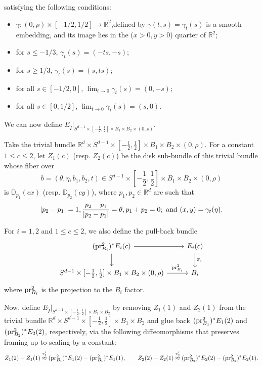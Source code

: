 \documentclass[11pt]{article}
\theoremstyle{definition}
\theoremstyle{remark}
\def\R{\mathbb{R}}
\def\D{\mathbb{D}}
\def\rI{{\mathring{I}}}
\def\tn#1{\textnormal{#1}}
\def\pr{{\textnormal{pr}}}
\begin{document}
satisfying the following conditions: 
\begin{itemize}
\item 
$\gamma:(0,\rho)\times[-1/2,1/2]\to\R^2$,defined by $\gamma(t,s)=\gamma_t(s)$ is a smooth embedding, and its image lies in the ($x>0,y>0$) quarter of $\R^2$;
\item for $s\leq-1/3$, $\gamma_t(s)=(-ts,-s)$; 
\item for $s\geq1/3$, $\gamma_t(s)=(s,ts)$;  
\item for all $s\in[-1/2,0]$, $\lim_{t\to0}\gamma_t(s)=(0,-s)$;
\item for all $s\in[0,1/2]$, $\lim_{t\to0}\gamma_t(s)=(s,0)$. 
\end{itemize}

We can now define $E_\rI|_{S^{d-1}\times[-\frac{1}{2},\frac{1}{2}]\times B_1\times B_2\times(0,\rho)}$.

Take the trivial bundle 
$\R^d\times S^{d-1}\times[-\frac{1}{2},\frac{1}{2}]\times B_1\times B_2\times(0,\rho)$. 
For a constant $1\le c\le2$, let $Z_1(c)$ (resp. $Z_2(c)$) be the disk sub-bundle of this trivial bundle whose fiber over $$b=(\theta,\eta,b_1,b_2,t)\in S^{d-1}\times[-\frac{1}{2},\frac{1}{2}]\times B_1\times B_2\times(0,\rho)$$ 
is $\D_{p_1}(cx)$ (resp. $\D_{p_2}(cy)$), 
where $p_1,p_2\in\R^d$ are such that \begin{equation}\label{xyp1p2_eqn}
|p_2-p_1|=1, \frac{p_2-p_1}{|p_2-p_1|}=\theta, p_1+p_2=0; \tn{ and } (x,y)=\gamma_t(\eta).
\end{equation}

For $i=1,2$ and $1\le c\le2$, we also define the pull-back bundle 
\[\begin{tikzcd}
(\pr^2_{B_i})^*E_i(c)\rar\dar & E_i(c)\dar["\pi_i"]\\
S^{d-1}\times[-\frac{1}{2},\frac{1}{2}]\times B_1\times B_2\times(0,\rho)\rar["\pr^2_{B_i}"] & B_i
\end{tikzcd}
\]
where $\pr^2_{B_i}$ is the projection to the $B_i$ factor. 

Now, define $E_\rI|_{S^{d-1}\times[-\frac{1}{2},\frac{1}{2}]\times B_1\times B_2}$ by removing $Z_1(1)$ and $Z_2(1)$ from the trivial bundle $\R^d\times S^{d-1}\times[-\frac{1}{2},\frac{1}{2}]\times B_1\times B_2$ 
and glue back $(\pr^2_{B_1})^*E_1(2)$ and $(\pr^2_{B_2})^*E_2(2)$, respectively, via the following diffeomorphisms that preserves framing up to scaling by a constant: 
$$Z_1(2)-Z_1(1)\stackrel{\tau'_1}{\approx} (\pr^2_{B_1})^*E_1(2)-(\pr^2_{B_1})^*E_1(1),\qquad Z_2(2)-Z_2(1)\stackrel{\tau'_2}{\approx} (\pr^2_{B_2})^*E_2(2)-(\pr^2_{B_2})^*E_2(1).$$
\end{document}
